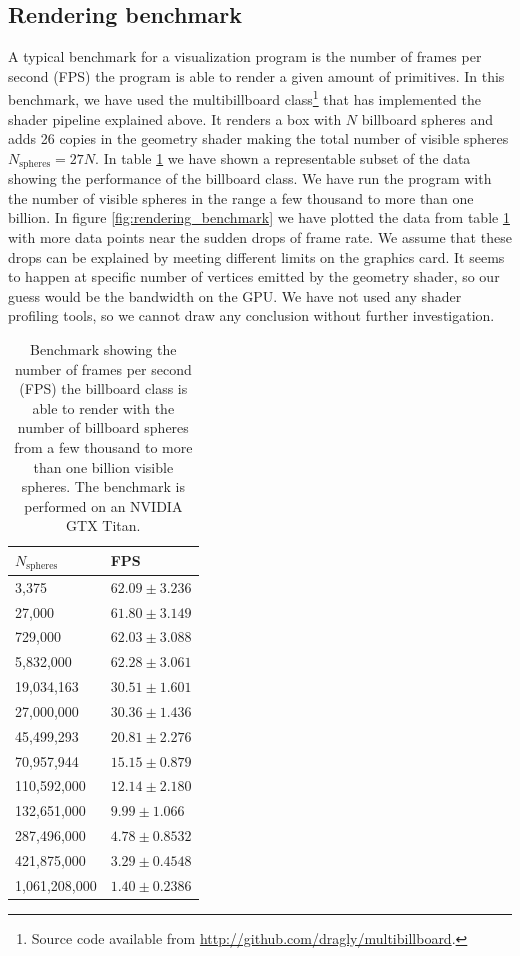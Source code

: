 \subsection{Rendering benchmark}
\label{sec:vis_benchmark}
A typical benchmark for a visualization program is the number of frames per second (FPS) the program is able to render a given amount of primitives. In this benchmark, we have used the multibillboard class\footnote{Source code available from \url{http://github.com/dragly/multibillboard}.} that has implemented the shader pipeline explained above. It renders a box with $N$ billboard spheres and adds 26 copies in the geometry shader making the total number of visible spheres $N_\text{spheres} = 27N$. In table \ref{tab:vis_fps_scaling} we have shown a representable subset of the data showing the performance of the billboard class. We have run the program with the number of visible spheres in the range a few thousand to more than one billion. In figure \ref{fig:rendering_benchmark} we have plotted the data from table \ref{tab:vis_fps_scaling} with more data points near the sudden drops of frame rate. We assume that these drops can be explained by meeting different limits on the graphics card. It seems to happen at specific number of vertices emitted by the geometry shader, so our guess would be the bandwidth on the GPU. We have not used any shader profiling tools, so we cannot draw any conclusion without further investigation. 
\begin{table}[h]
\begin{center}
    \begin{tabular}{|l|l|}
    \hline
    $N_\text{spheres}$ & FPS\\ \hline
    3,375      & $62.09 \pm 3.236$\\
    \hline
    27,000     & $61.80 \pm 3.149$\\
    \hline
    729,000    & $62.03 \pm 3.088$\\
    \hline
    5,832,000   & $62.28 \pm 3.061$\\
    \hline
    19,034,163  & $30.51 \pm 1.601$\\
    \hline
    27,000,000  & $30.36 \pm 1.436$\\
    \hline
    45,499,293  & $20.81 \pm 2.276$\\
    \hline
    70,957,944  & $15.15 \pm 0.879$\\
    \hline
    110,592,000 & $12.14 \pm 2.180$\\
    \hline
    132,651,000 & $9.99 \pm 1.066$\\
    \hline
    287,496,000 & $4.78 \pm 0.8532$\\
    \hline
    421,875,000 & $3.29 \pm 0.4548$\\
    \hline
    1,061,208,000 & $1.40 \pm 0.2386$\\
    \hline
    \end{tabular}
    \caption{Benchmark showing the number of frames per second (FPS) the billboard class is able to render with the number of billboard spheres from a few thousand to more than one billion visible spheres. The benchmark is performed on an NVIDIA GTX Titan.}
    \label{tab:vis_fps_scaling}
    \end{center}
\end{table}

